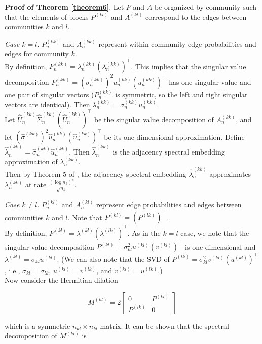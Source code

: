 \documentclass[12pt]{article}
\begin{document}
\textbf{Proof of Theorem \ref{theorem6}}. Let \(P\) and \(A\) be
organized by community such that the elements of blocks \(P^{(kl)}\) and
\(A^{(kl)}\) correspond to the edges between communities \(k\) and
\(l\).

\emph{Case \(k = l\)}. \(P^{(kk)}_n\) and \(A^{(kk)}_n\) represent
within-community edge probabilities and edges for community \(k\).\\
By definition, \(P^{(kk)}_n = \lambda^{(kk)}_n (\lambda^{(kk)}_n)^\top\). This
implies that the singular value decomposition
\(P^{(kk)}_n = (\sigma^{(kk)}_n)^2 u^{(kk)}_n (u^{(kk)}_n)^\top\)
has one singular
value and one pair of singular vectors (\(P^{(kk)}_n\) is symmetric, so
the left and right singular vectors are identical). Then
\(\lambda^{(kk)}_n = \sigma^{(kk)}_n u^{(kk)}_n\).\\
Let \(\hat{U}^{(kk)}_n \hat{\Sigma}^{(kk)}_n (\hat{U}^{(kk)}_n)^\top\) be the
singular value decomposition of \(A^{(kk)}_n\), and let
\((\hat{\sigma}^{(kk)})^2 \hat{u}^{(kk)}_n (\hat{u}^{(kk)}_n)^\top\) be its
one-dimensional approximation. Define
\(\hat{\lambda}^{(kk)}_n = \hat{\sigma}^{(kk)}_n \hat{u}^{(kk)}_n\). Then
\(\hat{\lambda}^{(kk)}_n\) is the adjacency spectral embedding
approximation of \(\lambda^{(kk)}_n\).\\
Then by Theorem 5 of \citeauthor{rubindelanchy2017statistical}, the
adjacency spectral embedding \(\hat{\lambda}^{(kk)}_n\) approximates
\(\lambda^{(kk)}_n\) at rate \(\frac{(\log n_k)^c}{\sqrt{n_k}}\).

\emph{Case \(k \neq l\)}. \(P^{(kl)}_n\) and \(A^{(kl)}_n\) represent edge
probabilities and edges between communities \(k\) and \(l\). Note that
\(P^{(kl)} = (P^{(lk)})^\top\).\\
By definition, \(P^{(kl)} = \lambda^{(kl)} (\lambda^{(lk)})^\top\). As
in the \(k = l\) case, we note that the singular value decomposition
\(P^{(kl)} = \sigma_{kl}^2 u^{(kl)} (v^{(kl)})^\top\) is one-dimensional
and \(\lambda^{(kl)} = \sigma_{kl} u^{(kl)}\). (We can also note that
the SVD of \(P^{(lk)} = \sigma_{kl}^2 v^{(kl)} (u^{(kl)})^\top\), i.e.,
\(\sigma_{kl} = \sigma_{lk}\), \(u^{(kl)} = v^{(lk)}\), and
\(v^{(kl)} = u^{(lk)}\).)\\
Now consider the Hermitian dilation

\[M^{(kl)} = 2 \begin{bmatrix} 0 & P^{(kl)} \\ P^{(lk)} & 0 \end{bmatrix}\]

which is a symmetric \(n_{kl} \times n_{kl}\) matrix. It can
be shown that the spectral decomposition of \(M^{(kl)}\) is
\end{document}
